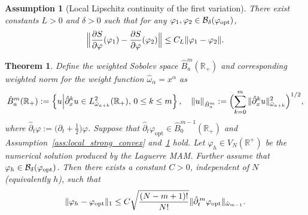 \documentclass[a4paper,fleqn, 12pt]{cas-sc}
\newtheorem{theorem}{Theorem}
\newtheorem{assumption}{Assumption}
\numberwithin{table}{section}
\begin{document}
\begin{assumption}[Local Lipschitz continuity of the first variation]
\label{ass:lipschitz_grad}
There exist constants $L>0$ and $\delta>0$ such that for any
$\varphi_1,\varphi_2\in \mathcal{B}_\delta(\varphi_{\rm opt})$,
\begin{equation}
\label{eq:lipschitz_grad}
\Bigl\|
\frac{\partial S}{\partial \varphi}(\varphi_1)
-\frac{\partial S}{\partial \varphi}(\varphi_2)
\Bigr\|
\le C_L \|\varphi_1-\varphi_2\| .
\end{equation}
\end{assumption}

\begin{theorem}
\label{thm:laguerre_apriori}
Define the weighted Sobolev space $\hat{B}_{a}^{m}(\mathbb{R}_{+})$ 
and corresponding weighted norm for the weight function ${\hat{\omega}_\alpha} = x^\alpha$ as
\[
\hat{B}_{a}^{m}(\mathbb{R}_{+}) := \left\{u \Big| \hat{\partial}_{x}^{k} u \in L_{\hat{\omega}_{a+k}}^{2}(\mathbb{R}_{+}), \, 0 \leq k \leq m\right\}, \quad \|u\|_{\hat{B}_{a}^{m}} := \Bigl( \sum_{k=0}^{m} \|\hat{\partial}_{x}^{k} u\|_{\hat{\omega}_{a+k}}^{2} \Bigr)^{1/2},
\]
where $\hat{\partial}_t \varphi := \bigl( \partial_t + \frac{1}{2} \bigr) \varphi$.
Suppose that $\hat{\partial}_t \varphi_\text{opt} \in \hat{B}_{0}^{m-1}(\mathbb{R}_+)$ and Assumption~\ref{ass:local_strong_convex} and~\ref{ass:lipschitz_grad} hold.
Let $\varphi_h\in V_N(\mathbb{R}^+)$ be the numerical solution
produced by the Laguerre MAM. Further assume that
$\varphi_h\in \mathcal{B}_\delta(\varphi_{\rm opt})$.
Then there exists a constant $C>0$, independent of $N$ (equivalently $h$),
such that
\begin{equation}
\label{eq:apriori_est}
\|\varphi_h-\varphi_{\rm opt}\|_1
\le C \sqrt{\frac{(N-m+1)!}{N!}} \|\hat{\partial}_t^{\,m}\varphi_{\rm opt}\|_{\hat{\omega}_{m-1}}.
\end{equation}
\end{theorem}
\end{document}
